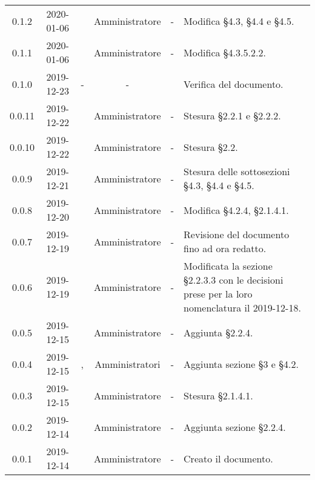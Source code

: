 {\begin{longtable}{ c c  C{2.3cm} c C{3cm} C{3.2cm}}
0.1.2 & 2020-01-06 & \AT{} & Amministratore & - & Modifica §4.3, §4.4 e §4.5. \\

0.1.1 & 2020-01-06 & \AT{} & Amministratore & - & Modifica §4.3.5.2.2. \\

0.1.0 & 2019-12-23 & - & - & \CE{} & Verifica del documento. \\

0.0.11 & 2019-12-22 & \PF{} & Amministratore & - & Stesura §2.2.1 e §2.2.2. \\

0.0.10 & 2019-12-22 & \PF{} & Amministratore & - & Stesura §2.2. \\

0.0.9 & 2019-12-21 & \PF{} & Amministratore & - & Stesura delle sottosezioni §4.3, §4.4 e §4.5. \\

0.0.8 & 2019-12-20 & \MC{} & Amministratore & - & Modifica §4.2.4, §2.1.4.1. \\

0.0.7 & 2019-12-19 & \SE{} & Amministratore & - & Revisione del documento fino ad ora redatto. \\

0.0.6 & 2019-12-19 & \CE{} & Amministratore & - & Modificata la sezione §2.2.3.3 con le decisioni prese per la loro nomenclatura il 2019-12-18. \\

0.0.5 & 2019-12-15 & \SE{} & Amministratore & - & Aggiunta §2.2.4. \\

0.0.4 & 2019-12-15 & \BR{}, \PF{} & Amministratori & - & Aggiunta sezione §3 e §4.2. \\

0.0.3 & 2019-12-15 & \MC{} & Amministratore & - & Stesura §2.1.4.1. \\

0.0.2 & 2019-12-14 & \CE{} & Amministratore & - & Aggiunta sezione §2.2.4. \\

0.0.1 & 2019-12-14 & \CE{} & Amministratore & - & Creato il documento. \\
		
\end{longtable}
}